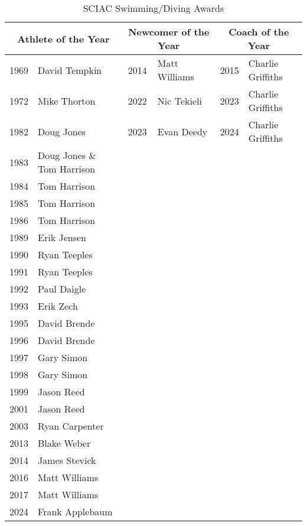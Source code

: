 \begin{table}[htbp]
\centering
\footnotesize
\caption*{SCIAC Swimming/Diving Awards}
\begin{tabular}{c l | c l | c l}
\toprule
\multicolumn{2}{c|}{\textbf{Athlete of the Year}} & \multicolumn{2}{c|}{\textbf{Newcomer of the Year}} & \multicolumn{2}{c}{\textbf{Coach of the Year}} \\
\midrule
1969 & David Tempkin & 2014 & Matt Williams & 2015 & Charlie Griffiths \\
1972 & Mike Thorton & 2022 & Nic Tekieli & 2023 & Charlie Griffiths \\
1982 & Doug Jones & 2023 & Evan Deedy & 2024 & Charlie Griffiths \\
1983 & Doug Jones \& Tom Harrison & & & & \\
1984 & Tom Harrison & & & & \\
1985 & Tom Harrison & & & & \\
1986 & Tom Harrison & & & & \\
1989 & Erik Jensen & & & & \\
1990 & Ryan Teeples & & & & \\
1991 & Ryan Teeples & & & & \\
1992 & Paul Daigle & & & & \\
1993 & Erik Zech & & & & \\
1995 & David Brende & & & & \\
1996 & David Brende & & & & \\
1997 & Gary Simon & & & & \\
1998 & Gary Simon & & & & \\
1999 & Jason Reed & & & & \\
2001 & Jason Reed & & & & \\
2003 & Ryan Carpenter & & & & \\
2013 & Blake Weber & & & & \\
2014 & James Stevick & & & & \\
2016 & Matt Williams & & & & \\
2017 & Matt Williams & & & & \\
2024 & Frank Applebaum & & & & \\
\bottomrule
\end{tabular}
\end{table}

